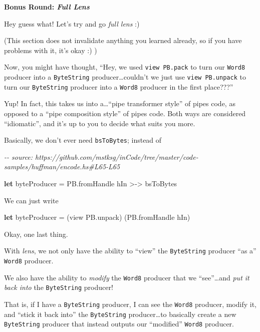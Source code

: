\documentclass[]{article}
\newenvironment{Shaded}{}{}
\newcommand{\CommentTok}[1]{\textcolor[rgb]{0.38,0.63,0.69}{\textit{#1}}}
\newcommand{\KeywordTok}[1]{\textcolor[rgb]{0.00,0.44,0.13}{\textbf{#1}}}
\newcommand{\NormalTok}[1]{#1}
\newcommand{\OperatorTok}[1]{\textcolor[rgb]{0.40,0.40,0.40}{#1}}
\newcommand{\OtherTok}[1]{\textcolor[rgb]{0.00,0.44,0.13}{#1}}
\begin{document}
\textbf{Bonus Round: \emph{Full Lens}}

Hey guess what! Let's try and go \emph{full lens} :)

(This section does not invalidate anything you learned already, so if you have
problems with it, it's okay :) )

Now, you might have thought, ``Hey, we used \texttt{view\ PB.pack} to turn our
\texttt{Word8} producer into a \texttt{ByteString} producer\ldots couldn't we
just use \texttt{view\ PB.unpack} to turn our \texttt{ByteString} producer into
a \texttt{Word8} producer in the first place???''

Yup! In fact, this takes us into a\ldots{}``pipe transformer style'' of pipes
code, as opposed to a ``pipe composition style'' of pipes code. Both ways are
considered ``idiomatic'', and it's up to you to decide what suits you more.

Basically, we don't ever need \texttt{bsToBytes}; instead of

\begin{Shaded}
\begin{Highlighting}[]
\CommentTok{{-}{-} source: https://github.com/mstksg/inCode/tree/master/code{-}samples/huffman/encode.hs\#L65{-}L65}

    \KeywordTok{let}\NormalTok{ byteProducer }\OtherTok{=}\NormalTok{ PB.fromHandle hIn }\OperatorTok{\textgreater{}{-}\textgreater{}}\NormalTok{ bsToBytes}
\end{Highlighting}
\end{Shaded}

We can just write

\begin{Shaded}
\begin{Highlighting}[]
\KeywordTok{let}\NormalTok{ byteProducer }\OtherTok{=}\NormalTok{ (view PB.unpack) (PB.fromHandle hIn)}
\end{Highlighting}
\end{Shaded}

Okay, one last thing.

With \emph{lens}, we not only have the ability to ``view'' the
\texttt{ByteString} producer ``as a'' \texttt{Word8} producer.

We also have the ability to \emph{modify} the \texttt{Word8} producer that we
``see''\ldots and \emph{put it back into} the \texttt{ByteString} producer!

That is, if I have a \texttt{ByteString} producer, I can see the \texttt{Word8}
producer, modify it, and ``stick it back into'' the \texttt{ByteString}
producer\ldots to basically create a new \texttt{ByteString} producer that
instead outputs our ``modified'' \texttt{Word8} producer.
\end{document}
